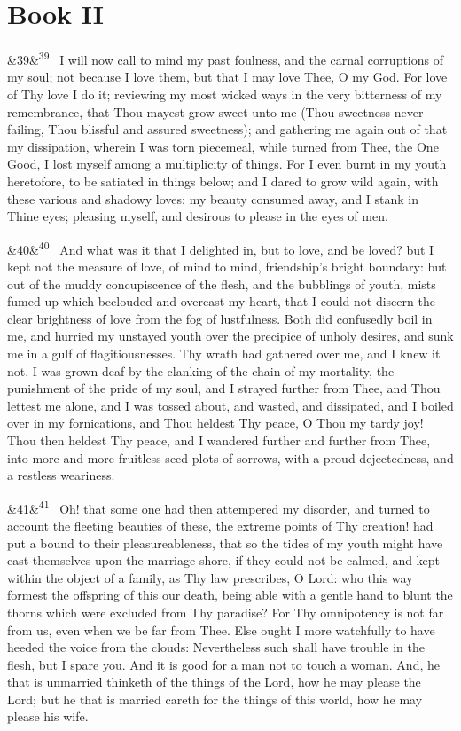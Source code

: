 \documentclass[12pt]{article}
\newcommand{\para}[1][]{\par\noindent\ifx&#1&\else\textsuperscript{\footnotesize #1}~\fi}
\begin{document}
\section*{Book II}

\para[39] I will now call to mind my past foulness, and the carnal corruptions of my soul; not because I love them, but that I may love Thee, O my God. For love of Thy love I do it; reviewing my most wicked ways in the very bitterness of my remembrance, that Thou mayest grow sweet unto me (Thou sweetness never failing, Thou blissful and assured sweetness); and gathering me again out of that my dissipation, wherein I was torn piecemeal, while turned from Thee, the One Good, I lost myself among a multiplicity of things. For I even burnt in my youth heretofore, to be satiated in things below; and I dared to grow wild again, with these various and shadowy loves: my beauty consumed away, and I stank in Thine eyes; pleasing myself, and desirous to please in the eyes of men.

\para[40] And what was it that I delighted in, but to love, and be loved? but I kept not the measure of love, of mind to mind, friendship's bright boundary: but out of the muddy concupiscence of the flesh, and the bubblings of youth, mists fumed up which beclouded and overcast my heart, that I could not discern the clear brightness of love from the fog of lustfulness. Both did confusedly boil in me, and hurried my unstayed youth over the precipice of unholy desires, and sunk me in a gulf of flagitiousnesses. Thy wrath had gathered over me, and I knew it not. I was grown deaf by the clanking of the chain of my mortality, the punishment of the pride of my soul, and I strayed further from Thee, and Thou lettest me alone, and I was tossed about, and wasted, and dissipated, and I boiled over in my fornications, and Thou heldest Thy peace, O Thou my tardy joy! Thou then heldest Thy peace, and I wandered further and further from Thee, into more and more fruitless seed-plots of sorrows, with a proud dejectedness, and a restless weariness.

\para[41] Oh! that some one had then attempered my disorder, and turned to account the fleeting beauties of these, the extreme points of Thy creation! had put a bound to their pleasureableness, that so the tides of my youth might have cast themselves upon the marriage shore, if they could not be calmed, and kept within the object of a family, as Thy law prescribes, O Lord: who this way formest the offspring of this our death, being able with a gentle hand to blunt the thorns which were excluded from Thy paradise? For Thy omnipotency is not far from us, even when we be far from Thee. Else ought I more watchfully to have heeded the voice from the clouds: Nevertheless such shall have trouble in the flesh, but I spare you. And it is good for a man not to touch a woman. And, he that is unmarried thinketh of the things of the Lord, how he may please the Lord; but he that is married careth for the things of this world, how he may please his wife.
\end{document}
